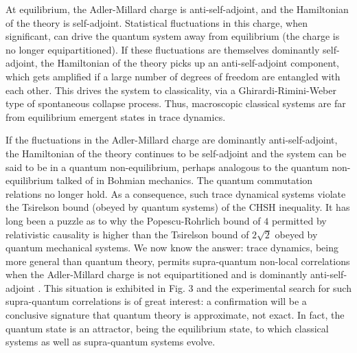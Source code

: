 \documentclass[a4paper]{jpconf}
\begin{document}
At equilibrium, the Adler-Millard charge is anti-self-adjoint, and the Hamiltonian of the theory is self-adjoint. Statistical fluctuations in this charge, when significant, can drive the quantum system away from equilibrium (the charge is no longer equipartitioned). If these fluctuations are themselves dominantly self-adjoint, the Hamiltonian of the theory picks up an anti-self-adjoint component, which gets amplified if a large number of degrees of freedom are entangled with each other. This drives the system to classicality, via a Ghirardi-Rimini-Weber type of spontaneous collapse process. Thus, macroscopic classical systems are far from equilibrium emergent states in trace dynamics. 

If the fluctuations in the Adler-Millard charge are dominantly anti-self-adjoint, the Hamiltonian of the theory continues to be self-adjoint and the system can be said to be in a quantum non-equilibrium, perhaps analogous to the quantum non-equilibrium talked of in Bohmian mechanics. The quantum commutation relations no longer hold. As a consequence, such trace dynamical systems violate the Tsirelson bound (obeyed by quantum systems) of the CHSH inequality. It has long been a puzzle as to why the Popescu-Rohrlich bound of $4$ permitted by relativistic causality is higher than the Tsirelson bound of $2\sqrt{2}$ obeyed by quantum mechanical systems. We now know the answer: trace dynamics, being more general than quantum theory, permits supra-quantum non-local correlations when the Adler-Millard charge is not equipartitioned and is dominantly anti-self-adjoint \cite{Ahmed}. This situation is exhibited in Fig. 3 and the experimental search for such supra-quantum correlations is of great interest: a confirmation will be a conclusive signature that quantum theory is approximate, not exact. In fact, the quantum state is an attractor, being the equilibrium state, to which classical systems as well as supra-quantum systems evolve.
\end{document}
